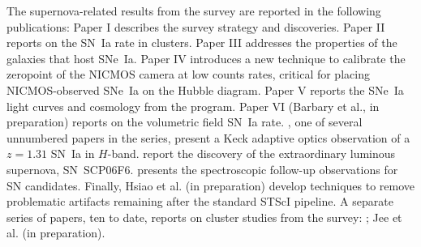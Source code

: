The supernova-related results from the survey are reported in the
following publications: Paper I \citep{dawson09a} describes the survey
strategy and discoveries. Paper II \citep{barbary11a} reports on the
SN~Ia rate in clusters. Paper III \citep{meyers11a} addresses the
properties of the galaxies that host SNe~Ia. Paper
IV \citep{ripoche11a} introduces a new technique to calibrate the
zeropoint of the NICMOS camera at low counts rates, critical for
placing NICMOS-observed SNe~Ia on the Hubble diagram. Paper
V \citep{suzuki11a} reports the SNe~Ia light curves and cosmology from
the program. Paper VI (Barbary et al., in preparation) reports on the
volumetric field SN~Ia rate. \citet{melbourne07a}, one of several
unnumbered papers in the series, present a Keck adaptive optics
observation of a $z=1.31$ SN~Ia in $H$-band. \citet{barbary09a} report
the discovery of the extraordinary luminous supernova,
SN~SCP06F6. \citet{morokuma10a} presents the spectroscopic follow-up
observations for SN candidates. Finally, Hsiao et al. (in preparation)
develop techniques to remove problematic artifacts remaining after the
standard STScI pipeline. A separate series of papers, ten to date,
reports on cluster studies from the survey:
\citet{hilton07a,eisenhardt08a,jee09a,hilton09a,huang09a,rosati09a,
santos09a,strazzullo10a,brodwin10a}; Jee et al. (in preparation).
